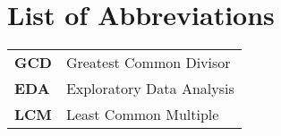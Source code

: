 \section*{List of Abbreviations}

\begin{tabular}{ l l }
  \textbf{GCD} & Greatest Common Divisor    \\
  \textbf{EDA} & Exploratory Data Analysis  \\
  \textbf{LCM} & Least Common Multiple      \\
\end{tabular}